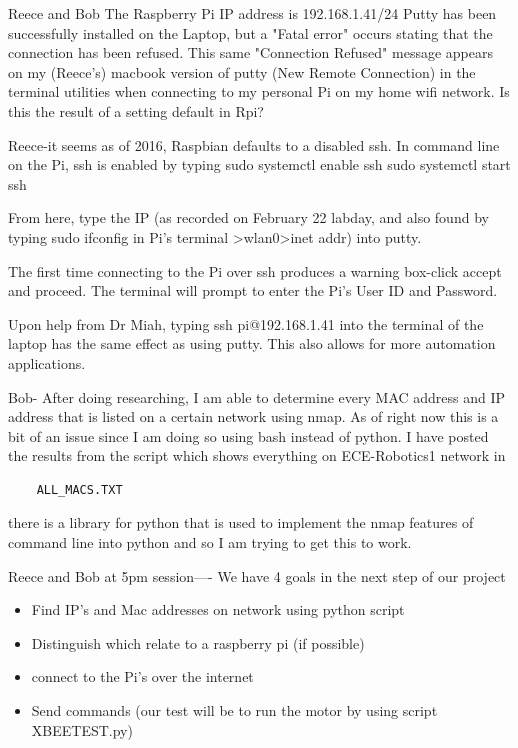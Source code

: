 \documentclass[fontsize=11pt, %
                             paper=letter, %
                             twoside, %
                             captions=tableheading,
                             index=totoc,
                             hyperref]{labbook}
\begin{document}
Reece and Bob
The Raspberry Pi IP address is 192.168.1.41/24
Putty has been successfully installed on the Laptop, but a "Fatal error" occurs stating that the connection has been refused. This same "Connection Refused" message appears on my (Reece's) macbook version of putty (New Remote Connection) in the terminal utilities when connecting to my personal Pi on my home wifi network. Is this the result of a setting default in Rpi? 


Reece-it seems as of 2016, Raspbian defaults to a disabled ssh. In command line on the Pi, ssh is enabled by typing 
sudo systemctl enable ssh
sudo systemctl start ssh

From here, type the IP (as recorded on February 22 labday, and also found by typing sudo ifconfig in Pi's terminal >wlan0>inet addr) into putty. 

The first time connecting to the Pi over ssh produces a warning box-click accept and proceed. The terminal will prompt to enter the Pi's User ID and Password. 

Upon help from Dr Miah, typing ssh pi@192.168.1.41 into the terminal of the laptop has the same effect as using putty. This also allows for more automation applications.


Bob- After doing researching, I am able to determine every MAC address and IP address that is listed on a certain network using nmap. As of right now this is a bit of an issue since I am doing so using bash instead of python. I have posted the results from the script which shows everything on ECE-Robotics1 network in \begin{verbatim}
    ALL_MACS.TXT
\end{verbatim}
there is a library for python that is used to implement the nmap features of command line into python and so I am trying to get this to work.

Reece and Bob at 5pm session----
We have 4 goals in the next step of our project
\begin{itemize}
    \item Find IP's and Mac addresses on network using python script
    \item Distinguish which relate to a raspberry pi (if possible) 
    \item connect to the Pi's over the internet
    \item Send commands (our test will be to run the motor by using script XBEETEST.py)
\end{itemize}
\end{document}
